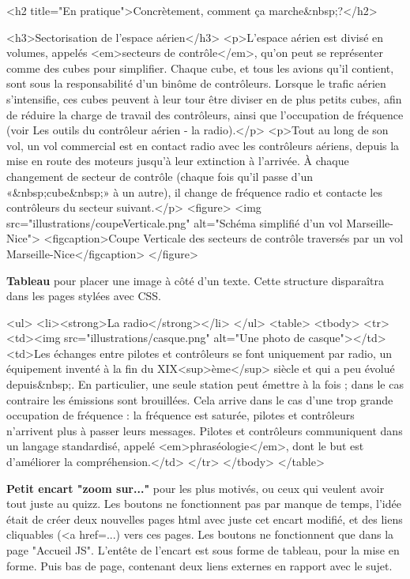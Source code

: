 \documentclass[11pt]{article}
\begin{document}
	\begin{code2}
			<h2 title="En pratique">Concrètement, comment ça marche&nbsp;?</h2>

			<h3>Sectorisation de l'espace aérien</h3>
			<p>L'espace aérien est divisé en volumes, appelés <em>secteurs de contrôle</em>, qu'on peut se représenter comme des cubes pour simplifier. Chaque cube, et tous les avions qu'il contient, sont sous la responsabilité d'un binôme de contrôleurs. Lorsque le trafic aérien s'intensifie, ces cubes peuvent à leur tour être diviser en de plus petits cubes, afin de réduire la charge de travail des contrôleurs, ainsi que l'occupation de fréquence (voir Les outils du contrôleur aérien - la radio).</p>
			<p>Tout au long de son vol, un vol commercial est en contact radio avec les contrôleurs aériens, depuis la mise en route des moteurs jusqu'à leur extinction à l'arrivée. À chaque changement de secteur de contrôle (chaque fois qu'il passe d'un «&nbsp;cube&nbsp;» à un autre), il change de fréquence radio et contacte les contrôleurs du secteur suivant.</p>
			<figure>
				<img src="illustrations/coupeVerticale.png" alt="Schéma simplifié d'un vol Marseille-Nice">
				<figcaption>Coupe Verticale des secteurs de contrôle traversés par un vol Marseille-Nice</figcaption>
			</figure>
\end{code2}

	\textbf{Tableau} pour placer une image à côté d’un texte. Cette structure disparaîtra dans les pages stylées avec CSS.
	
	\smallskip 	
	
	\begin{code2}
			<ul>
				<li><strong>La radio</strong></li>
			</ul>
			<table>
				<tbody>
					<tr>
						<td><img src="illustrations/casque.png" alt="Une photo de casque"></td>
						<td>Les échanges entre pilotes et contrôleurs se font uniquement par radio, un équipement inventé à la fin du XIX<sup>ème</sup> siècle et qui a peu évolué depuis&nbsp;. En particulier, une seule station peut émettre à la fois ; dans le cas contraire les émissions sont brouillées. Cela arrive dans le cas d'une trop grande occupation de fréquence : la fréquence est saturée, pilotes et contrôleurs n'arrivent plus à passer leurs messages. Pilotes et contrôleurs communiquent dans un langage standardisé, appelé <em>phraséologie</em>, dont le but est d'améliorer la compréhension.</td>
					</tr>
				</tbody>
			</table>
				\end{code2}
	
	\textbf{Petit encart "zoom sur..."} pour les plus motivés, ou ceux qui veulent avoir tout juste au quizz. Les boutons ne fonctionnent pas par manque de temps, l’idée était de créer deux nouvelles pages html avec juste cet encart modifié, et des liens cliquables (<a href=...) vers ces pages. Les boutons ne fonctionnent que dans la page "Accueil JS". L’entête de l’encart est sous forme de tableau, pour la mise en forme. Puis bas de page, contenant deux liens externes en rapport avec le sujet.
		
\end{document}
